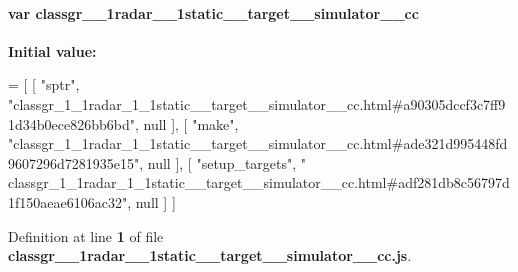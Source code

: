 \paragraph[{classgr\+\_\+1\+\_\+1radar\+\_\+1\+\_\+1static\+\_\+\+\_\+target\+\_\+\+\_\+simulator\+\_\+\+\_\+cc}]{\setlength{\rightskip}{0pt plus 5cm}var classgr\+\_\+\_\+1radar\+\_\+\_\+1static\+\_\+\+\_\+target\+\_\+\+\_\+simulator\+\_\+\+\_\+cc}\label{classgr__1__1radar__1__1static____target____simulator____cc_8js_a2418e2917ecbfdac3d542404aa127aa5}
{\bfseries Initial value\+:}
\begin{DoxyCode}
=
[
    [ \textcolor{stringliteral}{"sptr"}, \textcolor{stringliteral}{"classgr\_1\_1radar\_1\_1static\_\_target\_\_simulator\_\_cc.html#a90305dccf3c7ff91d34b0ece826bb6bd"}, 
      null ],
    [ \textcolor{stringliteral}{"make"}, \textcolor{stringliteral}{"classgr\_1\_1radar\_1\_1static\_\_target\_\_simulator\_\_cc.html#ade321d995448fd9607296d7281935e15"}, 
      null ],
    [ \textcolor{stringliteral}{"setup\_targets"}, \textcolor{stringliteral}{"
      classgr\_1\_1radar\_1\_1static\_\_target\_\_simulator\_\_cc.html#adf281db8c56797d1f150aeae6106ac32"}, null ]
]
\end{DoxyCode}


Definition at line {\bf 1} of file {\bf classgr\+\_\+\_\+1radar\+\_\+\_\+1static\+\_\+\+\_\+target\+\_\+\+\_\+simulator\+\_\+\+\_\+cc.\+js}.


